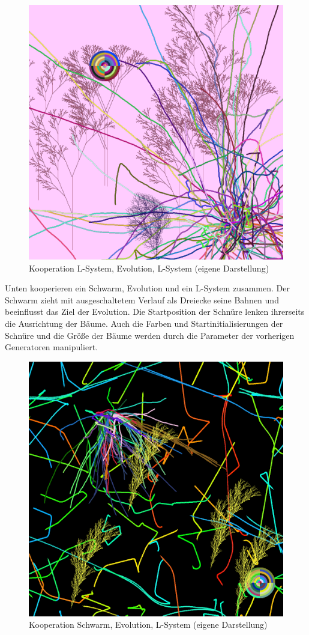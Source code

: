 \documentclass[../mciAusarbeitung.tex]{subfiles}
\begin{document}
		\begin{figure}[H]
			\centering
			\includegraphics[width=\linewidth]{img/dschungel.png}
			\caption[Dschungel]{Kooperation L-System, Evolution, L-System (eigene Darstellung)}
		\end{figure} 
		\noindent Unten kooperieren ein Schwarm, Evolution und ein L-System zusammen. Der Schwarm zieht mit ausgeschaltetem Verlauf als Dreiecke seine Bahnen und beeinflusst das Ziel der Evolution. Die Startposition der Schnüre lenken ihrerseits die Ausrichtung der Bäume. Auch die Farben und Startinitialisierungen der Schnüre und die Größe der Bäume werden durch die Parameter der vorherigen Generatoren manipuliert.\\
	 	\begin{figure}[H]
	 		\centering
	 		\includegraphics[width=\linewidth]{img/feuerwerk.png}
	 		\caption[Feuerwerk]{Kooperation Schwarm, Evolution, L-System (eigene Darstellung)}
	 	\end{figure} 
\end{document}
